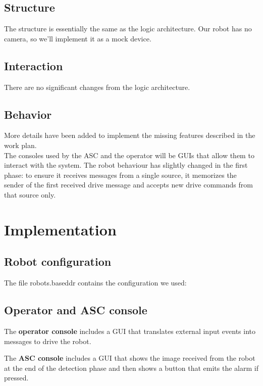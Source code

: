 \documentclass{llncs}
\newcommand{\labelsec}[1]{\label{sec:#1}}
\begin{document}
\subsection{Structure}
The structure is essentially the same as the logic architecture. Our robot has no camera, so we'll implement it as a mock device.
\subsection{Interaction}
There are no significant changes from the logic architecture.
\subsection{Behavior}
More details have been added to implement the missing features described in the work plan.\\
The consoles used by the ASC and the operator will be GUIs that allow them to interact with the system.
The robot behaviour has slightly changed in the first phase: to ensure it receives messages from a single source, it memorizes the sender of the first received drive message and accepts new drive commands from that source only.


\section{Implementation}
\labelsec{Implementation}
\subsection{Robot configuration}
The file robots.baseddr contains the configuration we used:

\subsection{Operator and ASC console}
The \textbf{operator console} includes a GUI that translates external input events into messages to drive the robot.

The \textbf{ASC console} includes a GUI that shows the image received from the robot at the end of the detection phase and then shows a button that emits the alarm if pressed.

\end{document}
